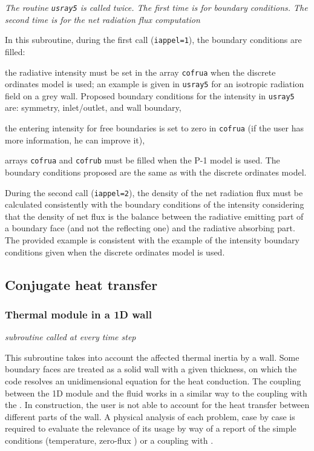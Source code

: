 {{\noindent
\textit{The routine \texttt{usray5} is called twice. The first time is for boundary
conditions. The second time is for the net radiation flux computation}

In this subroutine, during the first call (\texttt{iappel=1}), the boundary conditions
 are filled:
\begin{list}{-}{}
\item the radiative intensity must be set in the array \texttt{cofrua} when the discrete
 ordinates model is used; an example is given in \texttt{usray5} for an isotropic radiation
 field on a grey wall. Proposed boundary conditions for the intensity in \texttt{usray5} are:
symmetry, inlet/outlet, and wall boundary,
\item the entering intensity for free boundaries is set to zero in \texttt{cofrua} (if the
user has more information, he can improve it),
\item arrays \texttt{cofrua} and \texttt{cofrub} must be filled when the P-1 model is
 used. The boundary conditions proposed are the same as with the discrete ordinates model.
\end{list}
During the second call (\texttt{iappel=2}), the density of the net radiation flux must be
 calculated consistently with the boundary conditions of the intensity considering that the
density of net flux is the balance between the radiative emitting part of a boundary face
(and not the reflecting one) and the radiative absorbing part. The provided example is
consistent with the example of the intensity boundary conditions given when the discrete
 ordinates model is used.


\subsection{Conjugate heat transfer}
\subsubsection{Thermal module in a 1D wall}

\noindent
\textit{subroutine called at every time step}

This subroutine takes into account the affected thermal inertia by a wall.
 Some boundary faces are treated as a solid wall with a given thickness, on
 which the code resolves an unidimensional equation for the heat conduction.
 The coupling between the 1D module and the fluid works in a similar way to
 the coupling with the \syrthes. In construction, the user is not able to
 account for the heat transfer between different parts of the wall. A physical
 analysis of each problem, case by case is required to evaluate the relevance
 of its usage by way of a report of the simple conditions (temperature, zero-flux
 ) or a coupling with \syrthes.\\

}}
